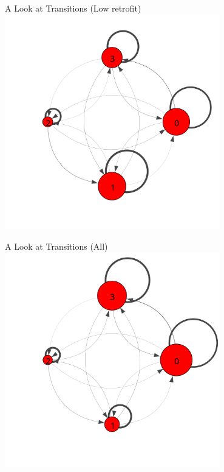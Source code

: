 \documentclass[10pt]{beamer}
\begin{document}
\begin{frame}{A Look at Transitions (Low retrofit)}
  \centering
  \includegraphics[width=0.70\textwidth]{../figures/trans-comp/trans-low.png}
\end{frame}

\begin{frame}{A Look at Transitions (All)}
  \centering
  \includegraphics[width=0.70\textwidth]{../figures/trans-comp/trans-avg.png}
\end{frame}
\end{document}
